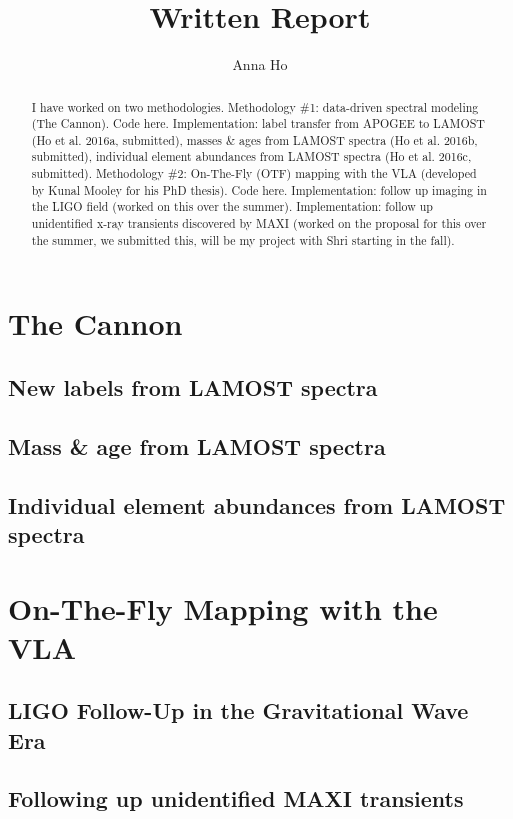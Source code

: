 \documentclass[12pt, letterpaper, preprint]{aastex}
\begin{document}
\title{Written Report}
\author{Anna Ho}

\begin{abstract}

  I have worked on two methodologies. Methodology \#1: data-driven
  spectral modeling (The Cannon). Code here. Implementation:
  label transfer from APOGEE to LAMOST (Ho et al. 2016a, submitted),
  masses \& ages from LAMOST spectra (Ho et al. 2016b, submitted),
  individual element abundances from LAMOST spectra (Ho et al. 2016c,
  submitted). 
  Methodology \#2: On-The-Fly (OTF) mapping with the VLA (developed
  by Kunal Mooley for his PhD thesis). Code here. Implementation:
  follow up imaging in the LIGO field (worked on this over the summer).
  Implementation: follow up unidentified x-ray transients discovered
  by MAXI (worked on the proposal for this over the summer, we submitted this,
  will be my project with Shri starting in the fall). 

\end{abstract}

\section{The Cannon}

\subsection{New labels from LAMOST spectra}

\subsection{Mass \& age from LAMOST spectra}

\subsection{Individual element abundances from LAMOST spectra}

\section{On-The-Fly Mapping with the VLA}

\subsection{LIGO Follow-Up in the Gravitational Wave Era}

\subsection{Following up unidentified MAXI transients}
\end{document}
